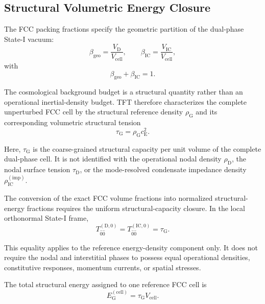 \subsection{Structural Volumetric Energy Closure}

The FCC packing fractions specify the geometric partition of the dual-phase State-I vacuum:
\begin{equation}
    \beta_{\mathrm{geo}} = \frac{V_{\mathrm{D}}}{V_{\mathrm{cell}}}, \qquad \beta_{\mathrm{IC}} = \frac{V_{\mathrm{IC}}}{V_{\mathrm{cell}}},
\end{equation}
with
\begin{equation}
    \beta_{\mathrm{geo}} + \beta_{\mathrm{IC}} = 1.
\end{equation}

The cosmological background budget is a structural quantity rather than an operational inertial-density budget. TFT therefore characterizes the complete unperturbed FCC cell by the structural reference density $\rho_{\mathrm{G}}$ and its corresponding volumetric structural tension
\begin{equation}
    \tau_{\mathrm{G}} = \rho_{\mathrm{G}}c_{\mathrm{E}}^2.
\end{equation}

Here, $\tau_{\mathrm{G}}$ is the coarse-grained structural capacity per unit volume of the complete dual-phase cell. It is not identified with the operational nodal density $\rho_{\mathrm{D}}$, the nodal surface tension $\tau_{\mathrm{D}}$, or the mode-resolved condensate impedance density $\rho_{\mathrm{IC}}^{(\mathrm{imp})}$.

The conversion of the exact FCC volume fractions into normalized structural-energy fractions requires the uniform structural-capacity closure. In the local orthonormal State-I frame,
\begin{equation}
    T_{\hat{0}\hat{0}}^{(\mathrm{D},0)} = T_{\hat{0}\hat{0}}^{(\mathrm{IC},0)} = \tau_{\mathrm{G}}.
\end{equation}

This equality applies to the reference energy-density component only. It does not require the nodal and interstitial phases to possess equal operational densities, constitutive responses, momentum currents, or spatial stresses.

The total structural energy assigned to one reference FCC cell is
\begin{equation}
    E_{\mathrm{G}}^{(\mathrm{cell})} = \tau_{\mathrm{G}}V_{\mathrm{cell}}.
\end{equation}

